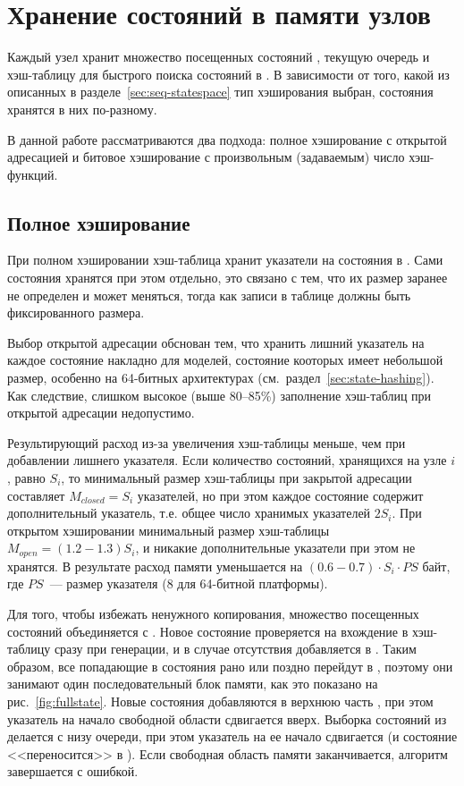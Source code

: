 \section{Хранение состояний в памяти узлов}
\label{sec:par-state-store}

Каждый узел хранит множество посещенных состояний , текущую очередь
 и хэш-таблицу для быстрого поиска состояний в . В зависимости
от того, какой из описанных в разделе~\ref{sec:seq-statespace} тип хэширования выбран,
состояния хранятся в них по-разному.

В данной работе рассматриваются два подхода: полное хэширование с открытой адресацией и
битовое хэширование с произвольным (задаваемым) число хэш-функций.

\subsection{Полное хэширование}
\label{sec:fullhash-store}

При полном хэшировании хэш-таблица хранит указатели на состояния в . Сами
состояния хранятся при этом отдельно, это связано с тем, что их размер заранее не
определен и может меняться, тогда как записи в таблице должны быть фиксированного размера.

Выбор открытой адресации обснован тем, что хранить лишний указатель на каждое состояние
накладно для моделей, состояние кооторых имеет небольшой размер, особенно на 64-битных
архитектурах (см.~раздел~\ref{sec:state-hashing}). Как следствие, слишком высокое (выше
80--85\%) заполнение хэш-таблиц при открытой адресации недопустимо.

Результирующий расход из-за увеличения хэш-таблицы меньше, чем при добавлении лишнего
указателя. Если количество состояний, хранящихся на узле $i$, равно $S_i$, то минимальный
размер хэш-таблицы при закрытой адресации составляет $M_{closed} = S_i$ указателей, но при
этом каждое состояние содержит дополнительный указатель, т.е. общее число хранимых
указателей $2 S_i$. При открытом хэшировании минимальный размер хэш-таблицы $M_{open} =
(1.2-1.3)S_i$, и никакие дополнительные указатели при этом не хранятся. В результате
расход памяти уменьшается на $(0.6-0.7)\cdot S_i\cdot PS$ байт, где $PS$~--- размер
указателя ($8$ для 64-битной платформы).

Для того, чтобы избежать ненужного копирования, множество посещенных состояний
 объединяется с . Новое состояние проверяется на вхождение в
хэш-таблицу сразу при генерации, и в случае отсутствия добавляется в . Таким
образом, все попадающие в  состояния рано или поздно перейдут в
, поэтому они занимают один последовательный блок памяти, как это показано
на рис.~\ref{fig:fullstate}. Новые состояния добавляются в верхнюю часть ,
при этом указатель на начало свободной области сдвигается вверх. Выборка состояний из
 делается с низу очереди, при этом указатель на ее начало сдвигается (и
состояние <<переносится>> в ). Если свободная область памяти заканчивается,
алгоритм завершается с ошибкой.

